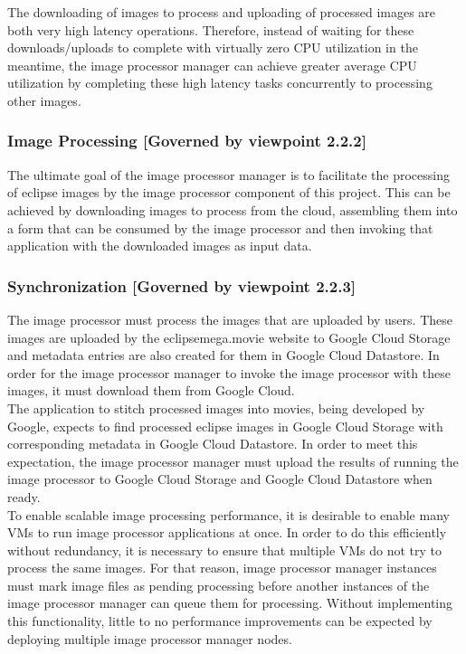 \documentclass[10pt, onecolumn, draftclsnofoot, letterpaper, compsoc]{IEEEtran}
\begin{document}
    The downloading of images to process and uploading of processed images are both very high latency 
    operations. Therefore, instead of waiting for these downloads/uploads to complete with virtually zero CPU 
    utilization in the meantime, the image processor manager can achieve greater average CPU utilization by 
    completing these high latency tasks concurrently to processing other images. \\

    \subsubsection{Image Processing [Governed by viewpoint 2.2.2]}
    The ultimate goal of the image processor manager is to facilitate the processing of eclipse images by the 
    image processor component of this project. This can be achieved by downloading images to process from the 
    cloud, assembling them into a form that can be consumed by the image processor and then invoking that 
    application with the downloaded images as input data. \\

    \subsubsection{Synchronization [Governed by viewpoint 2.2.3]}
    The image processor must process the images that are uploaded by users. These images are uploaded by the 
    eclipsemega.movie website to Google Cloud Storage and metadata entries are also created for them in Google 
    Cloud Datastore. In order for the image processor manager to invoke the image processor with these images, 
    it must download them from Google Cloud. \\

    The application to stitch processed images into movies, being developed by Google, expects to find 
    processed eclipse images in Google Cloud Storage with corresponding metadata in Google Cloud Datastore. In 
    order to meet this expectation, the image processor manager must upload the results of running the image 
    processor to Google Cloud Storage and Google Cloud Datastore when ready. \\

    To enable scalable image processing performance, it is desirable to enable many VMs to run image processor 
    applications at once. In order to do this efficiently without redundancy, it is necessary to ensure that 
    multiple VMs do not try to process the same images. For that reason, image processor manager instances must 
    mark image files as pending processing before another instances of the image processor manager can queue 
    them for processing. Without implementing this functionality, little to no performance improvements can be 
    expected by deploying multiple image processor manager nodes. \\
\end{document}
